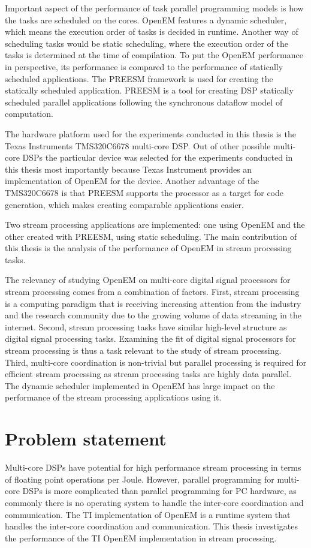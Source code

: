 Important aspect of the performance of task parallel programming models is how the tasks are scheduled on the cores. OpenEM features a dynamic scheduler, which means the execution order of tasks is decided in runtime. Another way of scheduling tasks would be static scheduling, where the execution order of the tasks is determined at the time of compilation. To put the OpenEM performance in perspective, its performance is compared to the performance of statically scheduled applications. The PREESM framework is used for creating the statically scheduled application. PREESM is a tool for creating DSP statically scheduled parallel applications following the synchronous dataflow model of computation.

The hardware platform used for the experiments conducted in this thesis is the Texas Instruments TMS320C6678 multi-core DSP. Out of other possible multi-core DSPs the particular device was selected for the experiments conducted in this thesis most importantly because Texas Instrument provides an implementation of OpenEM for the device. Another advantage of the TMS320C6678 is that PREESM supports the processor as a target for code generation, which makes creating comparable applications easier.

Two stream processing applications are implemented: one using OpenEM and the other created with PREESM, using static scheduling. The main contribution of this thesis is the analysis of the performance of OpenEM in stream processing tasks.

The relevancy of studying OpenEM on multi-core digital signal processors for stream processing comes from a combination of factors. First, stream processing is a computing paradigm that is receiving increasing attention from the industry and the research community due to the growing volume of data streaming in the internet. Second, stream processing tasks have similar high-level structure as digital signal processing tasks. Examining the fit of digital signal processors for stream processing is thus a task relevant to the study of stream processing. Third, multi-core coordination is non-trivial but parallel processing is required for efficient stream processing as stream processing tasks are highly data parallel. The dynamic scheduler implemented in OpenEM has large impact on the performance of the stream processing applications using it.

\section{Problem statement}
\label{section:problem-statement}
Multi-core DSPs have potential for high performance stream processing in terms of floating point operations per Joule. However, parallel programming for multi-core DSPs is more complicated than parallel programming for PC hardware, as commonly there is no operating system to handle the inter-core coordination and communication. The TI implementation of OpenEM is a runtime system that handles the inter-core coordination and communication. This thesis investigates the performance of the TI OpenEM implementation in stream processing.

